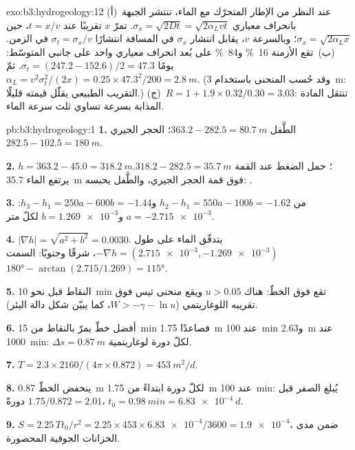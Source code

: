 \begin{solution}{exo:b3:hydrogeology:12}
(أ)~عند النظر من الإطار المتحرّك مع الماء، تنتشر الجبهة بانحراف
معياري $\sigma_x = \sqrt{2Dt} = \sqrt{2\alpha_Lvt}$. تمرّ
$x$ تقريبًا عند $t = x/v$، حين $\sigma_x = \sqrt{2\alpha_Lx}$؛ وبالسرعة
$v$، يقابل انتشار $\sigma_x$ في المسافة انتشارًا $\sigma_t = \sigma_x/v$
في الزمن. (ب)~تقع الأزمنة \qty{16}{\percent} و\qty{84}{\percent} على بُعد
انحراف معياري واحد على جانبي المتوسّط: $\sigma_t = (247.2 -
152.6)/2 = \num{47.3}\text{ يومًا}$. ثمّ $\alpha_L = v^2\sigma_t^2/(2x) =
0.25\times47.3^2/200 = \qty{2.8}{m}$. (وقد حُسب المنحنى باستخدام
\qty{3}{m}: التقريب الطبيعي يقلّل قيمته قليلًا.) (ج)~$R =
1 + 1.9\times0.32/0.30 = \num{3.03}$: تنتقل المادة المذابة بسرعة تساوي ثلث
سرعة الماء.
\end{solution}

\begin{solution}{pb:b3:hydrogeology:1}
\textbf{1.} الطَّفل $363.2 - 282.5 = \qty{80.7}{m}$؛ الحجر الجيري $282.5 -
102.5 = \qty{180}{m}$.

\textbf{2.} $h = 363.2 - 45.0 = \qty{318.2}{m}$؛ حمل الضغط عند القمة
$318.2 - 282.5 = \qty{35.7}{m}$. يرتفع الماء \qty{35.7}{m} فوق
قمة الحجر الجيري، والطَّفل يحبسه: .

\textbf{3.} من $h_2 - h_1 = 550a - 100b = -1.62$ و$h_3 - h_1 = 250a
- 600b = -1.44$: $a = \num{-2.715e-3}$ و$b = \num{1.269e-3}$ لكلّ
متر.

\textbf{4.} $|\nabla h| = \sqrt{a^2 + b^2} = \num{0.0030}$. يتدفّق الماء
على طول $-\nabla h = (\num{2.715e-3}, \num{-1.269e-3})$، شرقًا
وجنوبًا: السمت $\ang{180} - \arctan(2.715/1.269) = \ang{115}$.

\textbf{5.} النقاط قبل نحو \qty{10}{min} تقع فوق الخطّ: هناك
$u > 0.05$ ويقع منحنى ثيس فوق تقريبه اللوغاريتمي
($W > -\gamma - \ln u$، كما يبيّن شكل دالة البئر).

\textbf{6.} أفضل خطّ يمرّ بالنقاط من \qty{15}{min} فصاعدًا
\qty{1.75}{m} عند \qty{100}{min} و\qty{2.63}{m} عند \qty{1000}{min}:
$\Delta s = \qty{0.87}{m}$ لكلّ دورة لوغاريتمية.

\textbf{7.} $T = 2.3\times2160/(4\pi\times0.872) = \qty{453}{m^2/d}$.

\textbf{8.} ينخفض الخطّ \qty{0.87}{m} لكلّ دورة ابتداءً من \qty{1.75}{m} عند
\qty{100}{min}: يُبلغ الصفر قبل $1.75/0.872 = 2.01$ دورةً،
$t_0 = \qty{0.98}{min} = \qty{6.83e-4}{d}$.

\textbf{9.} $S = 2.25\,Tt_0/r^2 = 2.25\times453\times\num{6.83e-4}/3600 =
\num{1.9e-4}$، ضمن مدى الخزانات الجوفية المحصورة.


\end{solution}

